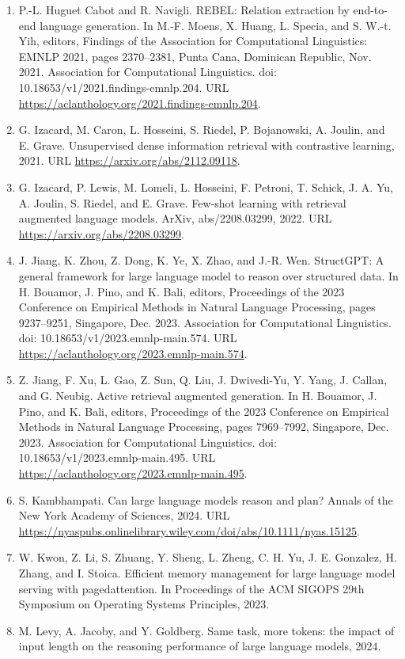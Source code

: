 \documentclass[11pt,UTF8,fontset=fandol]{ctexart}
\begin{document}
\begin{enumerate}[leftmargin=2em]
\item P.-L. Huguet Cabot and R. Navigli. REBEL: Relation extraction by end-to-end language generation. In M.-F. Moens, X. Huang, L. Specia, and S. W.-t. Yih, editors, Findings of the Association for Computational Linguistics: EMNLP 2021, pages 2370--2381, Punta Cana, Dominican Republic, Nov. 2021. Association for Computational Linguistics. doi: 10.18653/v1/2021.findings-emnlp.204. URL \url{https://aclanthology.org/2021.findings-emnlp.204}.
\item G. Izacard, M. Caron, L. Hosseini, S. Riedel, P. Bojanowski, A. Joulin, and E. Grave. Unsupervised dense information retrieval with contrastive learning, 2021. URL \url{https://arxiv.org/abs/2112.09118}.
\item G. Izacard, P. Lewis, M. Lomeli, L. Hosseini, F. Petroni, T. Schick, J. A. Yu, A. Joulin, S. Riedel, and E. Grave. Few-shot learning with retrieval augmented language models. ArXiv, abs/2208.03299, 2022. URL \url{https://arxiv.org/abs/2208.03299}.
\item J. Jiang, K. Zhou, Z. Dong, K. Ye, X. Zhao, and J.-R. Wen. StructGPT: A general framework for large language model to reason over structured data. In H. Bouamor, J. Pino, and K. Bali, editors, Proceedings of the 2023 Conference on Empirical Methods in Natural Language Processing, pages 9237--9251, Singapore, Dec. 2023. Association for Computational Linguistics. doi: 10.18653/v1/2023.emnlp-main.574. URL \url{https://aclanthology.org/2023.emnlp-main.574}.
\item Z. Jiang, F. Xu, L. Gao, Z. Sun, Q. Liu, J. Dwivedi-Yu, Y. Yang, J. Callan, and G. Neubig. Active retrieval augmented generation. In H. Bouamor, J. Pino, and K. Bali, editors, Proceedings of the 2023 Conference on Empirical Methods in Natural Language Processing, pages 7969--7992, Singapore, Dec. 2023. Association for Computational Linguistics. doi: 10.18653/v1/2023.emnlp-main.495. URL \url{https://aclanthology.org/2023.emnlp-main.495}.
\item S. Kambhampati. Can large language models reason and plan? Annals of the New York Academy of Sciences, 2024. URL \url{https://nyaspubs.onlinelibrary.wiley.com/doi/abs/10.1111/nyas.15125}.
\item W. Kwon, Z. Li, S. Zhuang, Y. Sheng, L. Zheng, C. H. Yu, J. E. Gonzalez, H. Zhang, and I. Stoica. Efficient memory management for large language model serving with pagedattention. In Proceedings of the ACM SIGOPS 29th Symposium on Operating Systems Principles, 2023.
\item M. Levy, A. Jacoby, and Y. Goldberg. Same task, more tokens: the impact of input length on the reasoning performance of large language models, 2024.

\end{enumerate}
\end{document}
